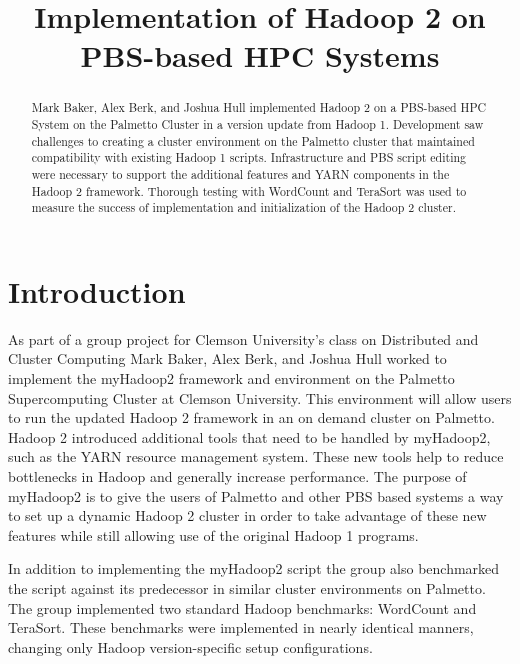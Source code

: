 \documentclass[conference]{IEEEtran}
\begin{document}
	\title{Implementation of Hadoop 2 on PBS-based HPC Systems}
	\author{
	}

	\maketitle

	\begin{abstract}
		Mark Baker, Alex Berk, and Joshua Hull implemented Hadoop 2 on a PBS-based HPC System on the Palmetto Cluster in a version update from Hadoop 1. Development saw challenges to creating a cluster environment on the Palmetto cluster that maintained compatibility with existing Hadoop 1 scripts. Infrastructure and PBS script editing were necessary to support the additional features and YARN components in the Hadoop 2 framework. Thorough testing with WordCount and TeraSort was used to measure the success of implementation and initialization of the Hadoop 2 cluster.
	\end{abstract}

	\section{Introduction}
		As part of a group project for Clemson University's class on Distributed and Cluster Computing Mark Baker, Alex Berk, and Joshua Hull worked to implement the myHadoop2 framework and environment on the Palmetto Supercomputing Cluster at Clemson University. This environment will allow users to run the updated Hadoop 2 framework in an on demand cluster on Palmetto. Hadoop 2 introduced additional tools that need to be handled by myHadoop2, such as the YARN resource management system. These new tools help to reduce bottlenecks in Hadoop and generally increase performance. The purpose of myHadoop2 is to give the users of Palmetto and other PBS based systems a way to set up a dynamic Hadoop 2 cluster in order to take advantage of these new features while still allowing use of the original Hadoop 1 programs.


        In addition to implementing the myHadoop2 script the group also benchmarked the script against its predecessor in similar cluster environments on Palmetto. The group implemented two standard Hadoop benchmarks: WordCount and TeraSort. These benchmarks were implemented in nearly identical manners, changing only Hadoop version-specific setup configurations.
\end{document}
